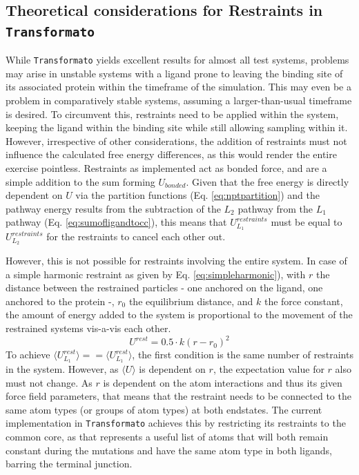 \documentclass[oneside]{scrreprt}
\begin{document}
\subsection{Theoretical considerations for Restraints in \texttt{Transformato}}
While \texttt{Transformato} yields excellent results for almost all test systems, problems may arise in unstable systems with a ligand prone to leaving the binding site of its associated protein within the timeframe of the simulation. This may even be a problem in comparatively stable systems, assuming a larger-than-usual timeframe is desired. To circumvent this, restraints need to be applied within the system, keeping the ligand within the binding site while still allowing sampling within it. However, irrespective of other considerations, the addition of restraints must not influence the calculated free energy differences, as this would render the entire exercise pointless. Restraints as implemented act as bonded force, and are a simple addition to the sum forming $U_{bonded}$. Given that the free energy is directly dependent on $U$ via the partition functions (Eq. \ref{eq:nptpartition}) and the pathway energy results from the subtraction of the $L_2$ pathway from the $L_1$ pathway (Eq. \ref{eq:sumofligandtocc}), this means that $U^{restraints}_{L_1}$ must be equal to $U^{restraints}_{L_2}$ for the restraints to cancel each other out.

However, this is not possible for restraints involving the entire system. In case of a simple harmonic restraint as given by Eq. \ref{eq:simpleharmonic}), with $r$ the distance between the restrained particles - one anchored on the ligand, one anchored to the protein -, $r_0$ the equilibrium distance, and $k$ the force constant,  the amount of energy added to the system is proportional to the movement of the restrained systems vis-a-vis each other.
\begin{equation}\label{eq:simpleharmonic}
    U^{rest}=0.5\cdot k(r-r_0)^2 
\end{equation}
To achieve $\langle U^{rest}_{L_1}\rangle == \langle U^{rest}_{L_1}\rangle$, the first condition is the same number of restraints in the system. However, as $\langle U \rangle$ is dependent on $r$, the expectation value for $r$  also must not change. As $r$ is dependent on the atom interactions and thus its given force field parameters, that means that the restraint needs to be connected to the same atom types (or groups of atom types) at both endstates. The current implementation in \texttt{Transformato} achieves this by restricting its restraints to the common core, as that represents a useful list of atoms that will both remain constant during the mutations and have the same atom type in both ligands, barring the terminal junction.
\end{document}
